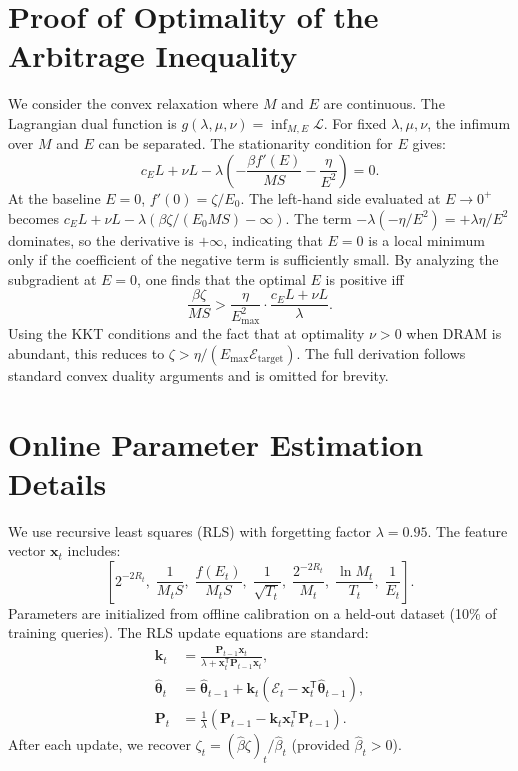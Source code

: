 \documentclass[11pt,a4paper]{article}
\theoremstyle{plain}
\theoremstyle{definition}
\begin{document}
\section{Proof of Optimality of the Arbitrage Inequality}
\label{app:optimality}
We consider the convex relaxation where $M$ and $E$ are continuous. The Lagrangian dual function is $g(\lambda,\mu,\nu)=\inf_{M,E}\mathcal{L}$. For fixed $\lambda,\mu,\nu$, the infimum over $M$ and $E$ can be separated. The stationarity condition for $E$ gives:
\[
c_E L + \nu L - \lambda\left(-\frac{\beta f'(E)}{M S} - \frac{\eta}{E^2}\right) = 0.
\]
At the baseline $E=0$, $f'(0)=\zeta/E_0$. The left-hand side evaluated at $E\to0^+$ becomes $c_E L + \nu L - \lambda(\beta\zeta/(E_0 M S) - \infty)$. The term $-\lambda(-\eta/E^2)=+\lambda\eta/E^2$ dominates, so the derivative is $+\infty$, indicating that $E=0$ is a local minimum only if the coefficient of the negative term is sufficiently small. By analyzing the subgradient at $E=0$, one finds that the optimal $E$ is positive iff
\[
\frac{\beta\zeta}{M S} > \frac{\eta}{E_{\max}^2} \cdot \frac{c_E L + \nu L}{\lambda}.
\]
Using the KKT conditions and the fact that at optimality $\nu>0$ when DRAM is abundant, this reduces to $\zeta > \eta/(E_{\max}\mathcal{E}_{\text{target}})$. The full derivation follows standard convex duality arguments and is omitted for brevity.

\section{Online Parameter Estimation Details}
We use recursive least squares (RLS) with forgetting factor $\lambda=0.95$. The feature vector $\mathbf{x}_t$ includes:
\[
\left[2^{-2R_t},\; \frac{1}{M_t S},\; \frac{f(E_t)}{M_t S},\; \frac{1}{\sqrt{T_t}},\; \frac{2^{-2R_t}}{M_t},\; \frac{\ln M_t}{T_t},\; \frac{1}{E_t}\right].
\]
Parameters are initialized from offline calibration on a held-out dataset (10\% of training queries). The RLS update equations are standard:
\begin{align*}
\mathbf{k}_t &= \frac{\mathbf{P}_{t-1}\mathbf{x}_t}{\lambda + \mathbf{x}_t^{\mathsf{T}}\mathbf{P}_{t-1}\mathbf{x}_t},\\
\hat{\boldsymbol{\theta}}_t &= \hat{\boldsymbol{\theta}}_{t-1} + \mathbf{k}_t(\mathcal{E}_t - \mathbf{x}_t^{\mathsf{T}}\hat{\boldsymbol{\theta}}_{t-1}),\\
\mathbf{P}_t &= \frac{1}{\lambda}\left(\mathbf{P}_{t-1} - \mathbf{k}_t\mathbf{x}_t^{\mathsf{T}}\mathbf{P}_{t-1}\right).
\end{align*}
After each update, we recover $\zeta_t = (\hat{\beta}\zeta)_t / \hat{\beta}_t$ (provided $\hat{\beta}_t>0$).
\end{document}
